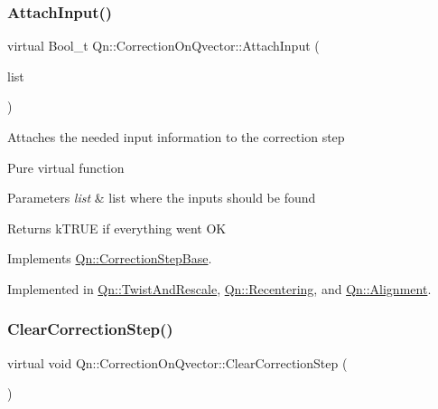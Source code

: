 \mbox{\label{classQn_1_1CorrectionOnQvector_acb7165c2eb071517fa977484bee7e445}} 
\subsubsection{\texorpdfstring{Attach\+Input()}{AttachInput()}}
{\footnotesize\ttfamily virtual Bool\+\_\+t Qn\+::\+Correction\+On\+Qvector\+::\+Attach\+Input (\begin{DoxyParamCaption}\item[{T\+List $\ast$}]{list }\end{DoxyParamCaption})\hspace{0.3cm}{\ttfamily [pure virtual]}}

Attaches the needed input information to the correction step

Pure virtual function 
\begin{DoxyParams}{Parameters}
{\em list} & list where the inputs should be found \\
\hline
\end{DoxyParams}
\begin{DoxyReturn}{Returns}
k\+T\+R\+UE if everything went OK 
\end{DoxyReturn}


Implements \mbox{\hyperlink{classQn_1_1CorrectionStepBase_aa778d3926bb1ee463753466f2216187d}{Qn\+::\+Correction\+Step\+Base}}.



Implemented in \mbox{\hyperlink{classQn_1_1TwistAndRescale_af6ca5526d392329f6f35adcc261de349}{Qn\+::\+Twist\+And\+Rescale}}, \mbox{\hyperlink{classQn_1_1Recentering_ae931dc184caefa05392992a15ae5b53f}{Qn\+::\+Recentering}}, and \mbox{\hyperlink{classQn_1_1Alignment_a3ae85e6706fe2a04098d339fcfff9113}{Qn\+::\+Alignment}}.

\mbox{\label{classQn_1_1CorrectionOnQvector_aeba6db851f1a9ac5c6fd7adbd81de140}} 
\subsubsection{\texorpdfstring{Clear\+Correction\+Step()}{ClearCorrectionStep()}}
{\footnotesize\ttfamily virtual void Qn\+::\+Correction\+On\+Qvector\+::\+Clear\+Correction\+Step (\begin{DoxyParamCaption}{ }\end{DoxyParamCaption})\hspace{0.3cm}{\ttfamily [pure virtual]}}

